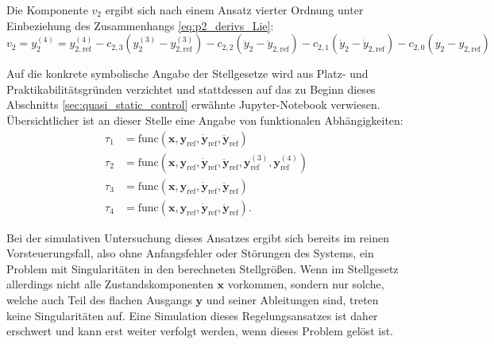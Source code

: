 Die Komponente $v_2$ ergibt sich nach einem Ansatz vierter Ordnung unter Einbeziehung des Zusammenhangs \eqref{eq:p2_derivs_Lie}:
\begin{equation}
	v_2 = y_2^{(4)} = y_{2, \text{ref}}^{(4)} - c_{2, 3} (y_2^{(3)} - y_{2, \text{ref}}^{(3)}) - c_{2, 2} (\ddot{y}_2 - \ddot{y}_{2, \text{ref}}) - c_{2, 1} (\dot{y}_2 - \dot{y}_{2, \text{ref}}) - c_{2, 0} (y_2 - y_{2, \text{ref}})
\end{equation} 

Auf die konkrete symbolische Angabe der Stellgesetze wird aus Platz- und Praktikabilitätsgründen verzichtet und stattdessen auf das zu Beginn dieses Abschnitts \ref{sec:quasi_static_control} erwähnte Jupyter-Notebook verwiesen. Übersichtlicher ist an dieser Stelle eine Angabe von funktionalen Abhängigkeiten:
\begin{subequations}
	\begin{align}
		\tau_1 &= \mathrm{func}(\mathbf{x}, \mathbf{y}_{\mathrm{ref}}, \dot{\mathbf{y}}_{\mathrm{ref}}, \ddot{\mathbf{y}}_{\mathrm{ref}}) \\
		\tau_2 &= \mathrm{func}(\mathbf{x}, \mathbf{y}_{\mathrm{ref}}, \dot{\mathbf{y}}_{\mathrm{ref}}, \ddot{\mathbf{y}}_{\mathrm{ref}}, \mathbf{y}_{\mathrm{ref}}^{(3)}, \mathbf{y}_{\mathrm{ref}}^{(4)}) \\
		\tau_3 &=\mathrm{func}(\mathbf{x}, \mathbf{y}_{\mathrm{ref}}, \dot{\mathbf{y}}_{\mathrm{ref}}, \ddot{\mathbf{y}}_{\mathrm{ref}}) \\
		\tau_4 &= \mathrm{func}(\mathbf{x}, \mathbf{y}_{\mathrm{ref}}, \dot{\mathbf{y}}_{\mathrm{ref}}, \ddot{\mathbf{y}}_{\mathrm{ref}}).
	\end{align}
\end{subequations}

Bei der simulativen Untersuchung dieses Ansatzes ergibt sich bereits im reinen Vorsteuerungsfall, also ohne Anfangsfehler oder Störungen des Systems, ein Problem mit Singularitäten in den berechneten Stellgrößen. Wenn im Stellgesetz allerdings nicht alle Zustandskomponenten $\mathbf{x}$ vorkommen, sondern nur solche, welche auch Teil des flachen Ausgangs $\mathbf{y}$ und seiner Ableitungen sind, treten keine Singularitäten auf. Eine Simulation dieses Regelungsansatzes ist daher erschwert und kann erst weiter verfolgt werden, wenn dieses Problem gelöst ist.

